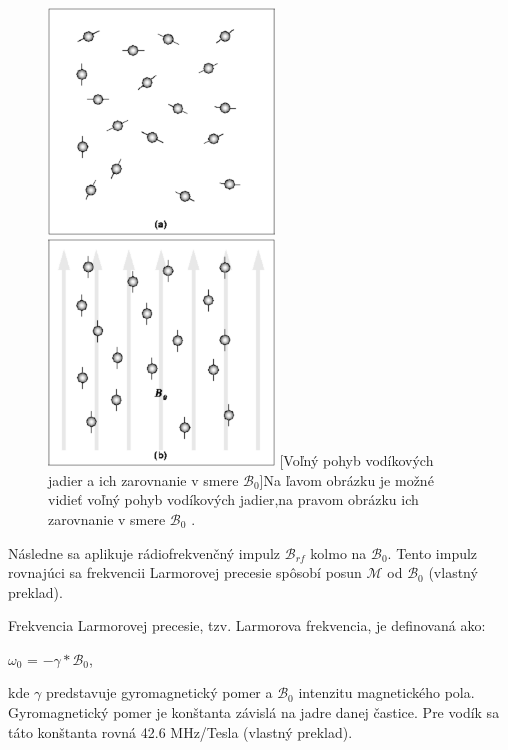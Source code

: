 \begin {figure}[H]
        \centering
        \includegraphics[height=6cm]{media/hydrogen/hydrogen_moving_freely.png}
        \includegraphics[height=6cm]{media/hydrogen/hydrogen_oscilating.png}
        \captionsetup{justification=centering}
        [Voľný pohyb vodíkových jadier a ich zarovnanie v smere $\mathcal{B}_{0}$]{Na ľavom obrázku je možné vidieť voľný pohyb vodíkových jadier,\newline na pravom obrázku ich zarovnanie v smere $\mathcal{B}_{0}$ \cite{basic_principles_of_mri}.}
\end {figure}

Následne sa aplikuje rádiofrekvenčný impulz $\mathcal{B}_{rf}$ kolmo na $\mathcal{B}_{0}$. \newline
Tento impulz rovnajúci sa frekvencii Larmorovej precesie spôsobí posun \newline $\mathcal{M}$ od $\mathcal{B}_{0}$ \cite{basic_principles_of_mri} (vlastný preklad).

\clearpage

Frekvencia Larmorovej precesie, tzv. Larmorova frekvencia, je definovaná ako:
\begin {center}
$\omega_{0}$ = $-\gamma * \mathcal{B}_{0}$,
\end {center}

kde $\gamma$ predstavuje gyromagnetický pomer a $\mathcal{B}_{0}$ intenzitu magnetického pola.
Gyromagnetický pomer je konštanta závislá na jadre danej častice. \newline Pre vodík sa táto konštanta rovná 42.6 MHz/Tesla \cite{basic_principles_of_mri} (vlastný preklad).

